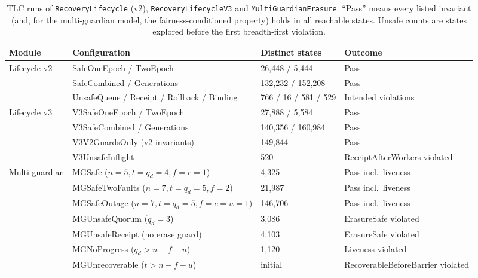 \documentclass[pdflatex,sn-mathphys-num]{sn-jnl}
\theoremstyle{plain}
\theoremstyle{definition}
\newcommand{\code}[1]{\texttt{#1}}
\begin{document}
\begin{table}[htbp]
\caption{TLC runs of \code{RecoveryLifecycle} (v2), \code{RecoveryLifecycleV3} and \code{MultiGuardianErasure}. ``Pass'' means every listed invariant (and, for the multi-guardian model, the fairness-conditioned property) holds in all reachable states. Unsafe counts are states explored before the first breadth-first violation.}\label{tab:tlc}
\centering\scriptsize
\begin{tabularx}{\linewidth}{@{}p{.19\linewidth}Yp{.17\linewidth}p{.2\linewidth}@{}}\toprule
Module & Configuration & Distinct states & Outcome\\\midrule
Lifecycle v2 & SafeOneEpoch / TwoEpoch & 26,448 / 5,444 & Pass\\
 & SafeCombined / Generations & 132,232 / 152,208 & Pass\\
 & UnsafeQueue / Receipt / Rollback / Binding & 766 / 16 / 581 / 529 & Intended violations\\
Lifecycle v3 & V3SafeOneEpoch / TwoEpoch & 27,888 / 5,584 & Pass\\
 & V3SafeCombined / Generations & 140,356 / 160,984 & Pass\\
 & V3V2GuardsOnly (v2 invariants) & 149,844 & Pass\\
 & V3UnsafeInflight & 520 & Receipt\-After\-Workers violated\\
Multi-guardian & MGSafe ($n{=}5,t{=}q_d{=}4,f{=}c{=}1$) & 4,325 & Pass incl.\ liveness\\
 & MGSafeTwoFaults ($n{=}7,t{=}q_d{=}5,f{=}2$) & 21,987 & Pass incl.\ liveness\\
 & MGSafeOutage ($n{=}7,t{=}q_d{=}5,f{=}c{=}u{=}1$) & 146,706 & Pass incl.\ liveness\\
 & MGUnsafeQuorum ($q_d{=}3$) & 3,086 & ErasureSafe violated\\
 & MGUnsafeReceipt (no erase guard) & 4,103 & ErasureSafe violated\\
 & MGNoProgress ($q_d>n-f-u$) & 1,120 & Liveness violated\\
 & MGUnrecoverable ($t>n-f-u$) & initial & Recoverable\-Before\-Barrier violated\\\bottomrule
\end{tabularx}
\end{table}
\end{document}
